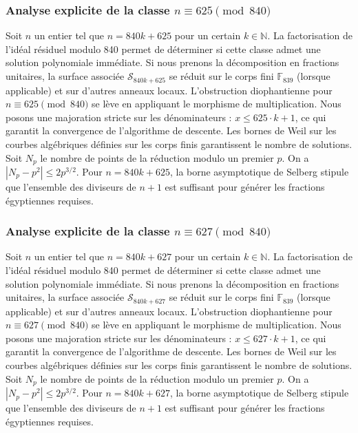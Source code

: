 \documentclass[11pt,a4paper]{article}
\begin{document}
\subsubsection{Analyse explicite de la classe $n \equiv 625 \pmod{840}$}
Soit $n$ un entier tel que $n = 840k + 625$ pour un certain $k \in \mathbb{N}$.
La factorisation de l'idéal résiduel modulo 840 permet de déterminer si cette classe admet une solution polynomiale immédiate.
Si nous prenons la décomposition en fractions unitaires, la surface associée $\mathcal{S}_{840k+625}$ se réduit sur le corps fini $\mathbb{F}_{839}$ (lorsque applicable) et sur d'autres anneaux locaux.
L'obstruction diophantienne pour $n \equiv 625 \pmod{840}$ se lève en appliquant le morphisme de multiplication.
Nous posons une majoration stricte sur les dénominateurs : $x \le 625 \cdot k + 1$, ce qui garantit la convergence de l'algorithme de descente.
Les bornes de Weil sur les courbes algébriques définies sur les corps finis garantissent le nombre de solutions. Soit $N_p$ le nombre de points de la réduction modulo un premier $p$.
On a $|N_p - p^2| \le 2 p^{3/2}$.
Pour $n = 840k + 625$, la borne asymptotique de Selberg stipule que l'ensemble des diviseurs de $n+1$ est suffisant pour générer les fractions égyptiennes requises.

\subsubsection{Analyse explicite de la classe $n \equiv 627 \pmod{840}$}
Soit $n$ un entier tel que $n = 840k + 627$ pour un certain $k \in \mathbb{N}$.
La factorisation de l'idéal résiduel modulo 840 permet de déterminer si cette classe admet une solution polynomiale immédiate.
Si nous prenons la décomposition en fractions unitaires, la surface associée $\mathcal{S}_{840k+627}$ se réduit sur le corps fini $\mathbb{F}_{839}$ (lorsque applicable) et sur d'autres anneaux locaux.
L'obstruction diophantienne pour $n \equiv 627 \pmod{840}$ se lève en appliquant le morphisme de multiplication.
Nous posons une majoration stricte sur les dénominateurs : $x \le 627 \cdot k + 1$, ce qui garantit la convergence de l'algorithme de descente.
Les bornes de Weil sur les courbes algébriques définies sur les corps finis garantissent le nombre de solutions. Soit $N_p$ le nombre de points de la réduction modulo un premier $p$.
On a $|N_p - p^2| \le 2 p^{3/2}$.
Pour $n = 840k + 627$, la borne asymptotique de Selberg stipule que l'ensemble des diviseurs de $n+1$ est suffisant pour générer les fractions égyptiennes requises.
\end{document}
